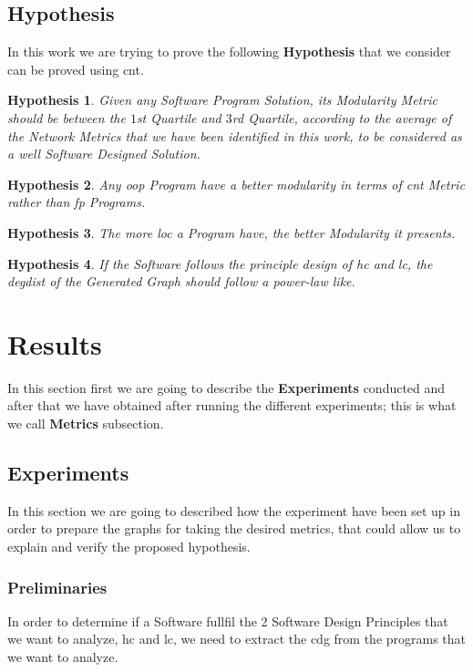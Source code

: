 \documentclass[12pt, a4paper]{article}
\newtheorem{hyp}{Hypothesis}
\begin{document}
\subsection{Hypothesis}
In this work we are trying to prove the following \textbf{Hypothesis} that we consider can be proved using \acrfull{cnt}.

\begin{hyp}\label{hip:1}
Given any Software Program Solution, its Modularity Metric should be between the  $1$st Quartile and $3$rd Quartile, according to the average of the Network Metrics that we have been identified in this work,
to be considered as a well Software Designed Solution.
\end{hyp}

\begin{hyp}\label{hip:2}
Any \acrlong{oop} Program have a better modularity in terms of \acrlong{cnt} Metric rather than \acrlong{fp} Programs.
\end{hyp}

\begin{hyp}\label{hip:3}
The more \acrfull{loc} a Program have, the better Modularity it presents.
\end{hyp}
    
\begin{hyp}\label{hip:4}
If the Software follows the principle design of \acrshort{hc} and \acrshort{lc}, the \acrfull{degdist} of the Generated Graph should follow a power-law like.
\end{hyp}

\section{Results}
In this section first we are going to describe the \textbf{Experiments} conducted and after that we have obtained after running the different experiments; this is what we call \textbf{Metrics} subsection.

\subsection{Experiments}
In this section we are going to described how the experiment have been set up in order to prepare the graphs for taking the desired metrics, that could allow us to explain and verify the proposed hypothesis.

\subsubsection{Preliminaries}
In order to determine if a Software fullfil the 2 Software Design Principles that we want to analyze, \acrshort{hc} and \acrshort{lc}, 
we need to extract the \acrfull{cdg} from the programs that we want to analyze.
\end{document}
